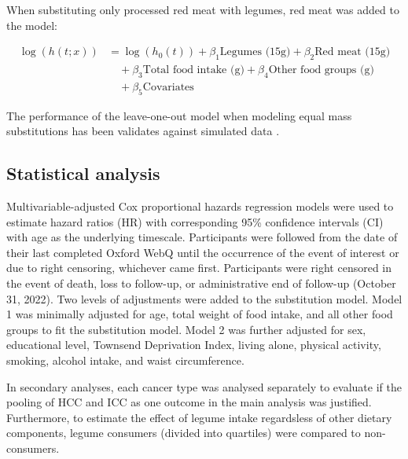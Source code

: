\documentclass[sn-basic,Numbered,pdflatex]{sn-jnl}
\begin{document}
\noindent When substituting only processed red meat with legumes, red
meat was added to the model:

\begin{align}
\log(h(t;x)) &= \log(h_0(t)) + \beta_1 \text{Legumes (15g)} + \beta_2 \text{Red meat (15g)} \nonumber \\
&\quad + \beta_3 \text{Total food intake (g)} + \beta_4 \text{Other food groups (g)} \nonumber \\
&\quad + \beta_5 \text{Covariates}
\end{align}

\noindent The performance of the leave-one-out model when modeling equal
mass substitutions has been validates against simulated data
\citep{Tomova2022}.

\hypertarget{subsec6}{%
\subsection{Statistical analysis}\label{subsec6}}

Multivariable-adjusted Cox proportional hazards regression models were
used to estimate hazard ratios (HR) with corresponding 95\% confidence
intervals (CI) with age as the underlying timescale. Participants were
followed from the date of their last completed Oxford WebQ until the
occurrence of the event of interest or due to right censoring, whichever
came first. Participants were right censored in the event of death, loss
to follow-up, or administrative end of follow-up (October 31, 2022). Two
levels of adjustments were added to the substitution model. Model 1 was
minimally adjusted for age, total weight of food intake, and all other
food groups to fit the substitution model. Model 2 was further adjusted
for sex, educational level, Townsend Deprivation Index, living alone,
physical activity, smoking, alcohol intake, and waist circumference.

In secondary analyses, each cancer type was analysed separately to
evaluate if the pooling of HCC and ICC as one outcome in the main
analysis was justified. Furthermore, to estimate the effect of legume
intake regardsless of other dietary components, legume consumers
(divided into quartiles) were compared to non-consumers.
\end{document}
